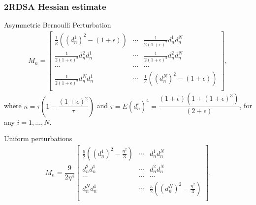 \begin{frame}[shrink=10]
\begin{small}
\frametitle{\centering  2RDSA Hessian estimate}
\begin{block}{Asymmetric Bernoulli Perturbation}
\begin{align}
\label{eq:2rdsa-estimate-ber}
 M_n =
\left[
\begin{array}{ccc}
\frac{1}{\kappa}\left((d_n^1)^2\!-(1+\epsilon)\right) & \cdots & \frac{1}{2(1+\epsilon)^2}d_n^1 d_n^N\\
\frac{1}{2(1+\epsilon)^2}d_n^2 d_n^1  &  \cdots & \frac{1}{2(1+\epsilon)^2}d_n^2 d_n^N\\
\cdots&\cdots&\cdots\\
\frac{1}{2(1+\epsilon)^2}d_n^N d_n^1 & \cdots &  \frac{1}{\kappa}\left((d_n^N)^2-(1+\epsilon)\right) \\
\end{array}
\right],
\end{align}
where $\kappa = \tau \left(1- \dfrac{(1+\epsilon)^2}{\tau}\right)$ and $\tau = E (d_n^i)^4= \dfrac{(1+\epsilon)(1+(1+\epsilon)^3)}{(2+\epsilon)}$, for any $i=1,\ldots,N$. 
\end{block}
\pause
\begin{block}{Uniform perturbations}
\begin{align}
\label{eq:2rdsa-estimate-unif}
M_n =
\dfrac{9}{2\eta^4}\left[
\begin{array}{cccc}
\frac{5}{2}\left((d_n^1)^2-\frac{\eta^2}{3}\right) & \cdots & d_n^1 d_n^N\\
d_n^2 d_n^1  &  \cdots & d_n^2 d_n^N\\
\cdots&\cdots&\cdots\\
d_n^N d_n^1 & \cdots &  \frac{5}{2}\left((d_n^N)^2-\frac{\eta^2}{3}\right) \\
\end{array}
\right].
\end{align}
\end{block}

\end{small}
\end{frame}





